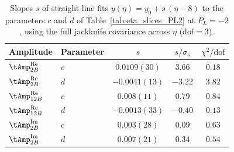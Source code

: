 \begin{table}
\caption{Slopes $s$ of straight-line fits $y(\eta)=y_0+s\,(\eta-8)$ to the parameters $c$ and $d$ of Table~\ref{tab:eta_slices_PL2} at $P_L=-2$, using the full jackknife covariance across $\eta$ ($\mathrm{dof}=3$).}
\label{tab:slopes_PL2}
\small
\renewcommand{\arraystretch}{1.3}
\begin{ruledtabular}
\begin{tabular}{llccc}
Amplitude & Parameter & $s$ & $s/\sigma_s$ & $\chi^2/\mathrm{dof}$ \\ \hline
$\tAmp_{2B}^{\text{Re}}$ & $c$ & $0.0109(30)$ & $3.66$ & $0.18$ \\
$\tAmp_{2B}^{\text{Re}}$ & $d$ & $-0.0041(13)$ & $-3.22$ & $3.82$ \\
$\tAmp_{12B}^{\text{Re}}$ & $c$ & $0.008(11)$ & $0.79$ & $0.84$ \\
$\tAmp_{12B}^{\text{Re}}$ & $d$ & $-0.0013(33)$ & $-0.40$ & $0.13$ \\
$\tAmp_{2B}^{\text{Im}}$ & $c$ & $0.003(28)$ & $0.09$ & $0.63$ \\
$\tAmp_{2B}^{\text{Im}}$ & $d$ & $0.007(21)$ & $0.34$ & $0.54$ \\
\end{tabular}
\end{ruledtabular}
\end{table}

